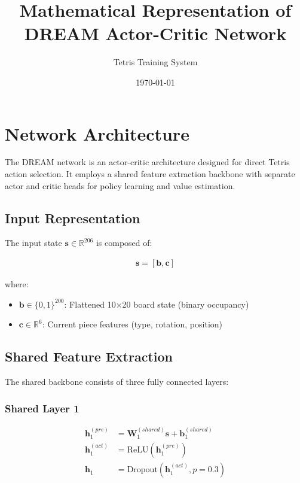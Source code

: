 \documentclass[12pt]{article}
\title{Mathematical Representation of DREAM Actor-Critic Network}
\author{Tetris Training System}
\date{\today}
\begin{document}
\maketitle

\section{Network Architecture}

The DREAM network is an actor-critic architecture designed for direct Tetris action selection. It employs a shared feature extraction backbone with separate actor and critic heads for policy learning and value estimation.

\subsection{Input Representation}

The input state $\mathbf{s} \in \mathbb{R}^{206}$ is composed of:

\begin{align}
\mathbf{s} = [\mathbf{b}, \mathbf{c}]
\end{align}

where:
\begin{itemize}
    \item $\mathbf{b} \in \{0,1\}^{200}$: Flattened 10×20 board state (binary occupancy)
    \item $\mathbf{c} \in \mathbb{R}^{6}$: Current piece features (type, rotation, position)
\end{itemize}

\subsection{Shared Feature Extraction}

The shared backbone consists of three fully connected layers:

\subsubsection{Shared Layer 1}
\begin{align}
\mathbf{h}_1^{(pre)} &= \mathbf{W}_1^{(shared)} \mathbf{s} + \mathbf{b}_1^{(shared)} \\
\mathbf{h}_1^{(act)} &= \text{ReLU}(\mathbf{h}_1^{(pre)}) \\
\mathbf{h}_1 &= \text{Dropout}(\mathbf{h}_1^{(act)}, p=0.3)
\end{align}
\end{document}
